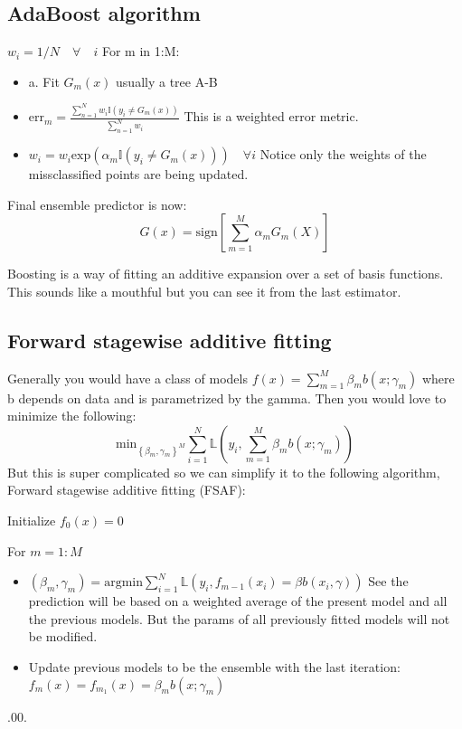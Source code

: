 \documentclass{article}
\begin{document}
\subsection*{AdaBoost algorithm}
$w_i = 1/N \quad \forall \quad i$
For m in 1:M:
\begin{itemize}
    \item a. Fit $G_m(x)$ usually a tree A-B 
    \item $\text{err}_m = \frac{\sum_{n = 1}^{N} w_i \mathbb{I}(y_i \neq G_m(x))}{\sum_{n = 1}^{N} w_i}$ 
    This is a weighted error metric.
    \item $w_i = w_i \text{exp}(\alpha_m \mathbb{I}(y_i \neq G_m(x))) \quad \forall i$ Notice only the weights of the missclassified points are 
    being updated.

\end{itemize}
Final ensemble predictor is now: $$G(x) = \text{sign}[\sum_{m = 1}^{M} \alpha_m G_m (X)]$$        

Boosting is a way of fitting an additive expansion over a set of basis functions. This sounds like a mouthful but you can see it from the last estimator. 

\subsection*{Forward stagewise additive fitting}
Generally you would have a class of models $f(x) = \sum_{m = 1}^{M} \beta_m b(x;\gamma_m)$ where b depends on data and is parametrized by the gamma.
Then you would love to minimize the following:
$$\text{min}_{\left\{\beta_m, \gamma_m\right\}^M } \sum_{i = 1}^{N} \mathbb{L} (y_i, \sum_{m = 1}^{M} \beta_m b(x;\gamma_m))  $$
But this is super complicated so we can simplify it to the following algorithm, Forward stagewise additive fitting (FSAF):

Initialize $f_0(x) = 0$

For $m = 1:M$
\begin{itemize}
    \item $(\beta_m,\gamma_m) = \text{argmin}\sum_{i = 1}^{N}  \mathbb{L}(y_i, f_{m-1}(x_i) = \beta b(x_i,\gamma)) $ See the prediction will be based on a 
    weighted average of the present model and all the previous models. But the params of all previously fitted models will not be modified.
    \item Update previous models to be the ensemble with the last iteration: $f_m(x) = f_{m_1}(x) = \beta_m b(x;\gamma_m)$
\end{itemize}.00.
\end{document}
